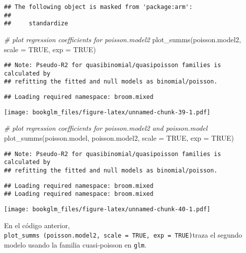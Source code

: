\documentclass[
]{book}
\newenvironment{Shaded}{\begin{snugshade}}{\end{snugshade}}
\newcommand{\AttributeTok}[1]{\textcolor[rgb]{0.77,0.63,0.00}{#1}}
\newcommand{\CommentTok}[1]{\textcolor[rgb]{0.56,0.35,0.01}{\textit{#1}}}
\newcommand{\ConstantTok}[1]{\textcolor[rgb]{0.00,0.00,0.00}{#1}}
\newcommand{\FunctionTok}[1]{\textcolor[rgb]{0.00,0.00,0.00}{#1}}
\newcommand{\NormalTok}[1]{#1}
\begin{document}
\begin{verbatim}
## The following object is masked from 'package:arm':
## 
##     standardize
\end{verbatim}

\begin{Shaded}
\begin{Highlighting}[]
\CommentTok{\# plot regression coefficients for poisson.model2}
\FunctionTok{plot\_summs}\NormalTok{(poisson.model2, }\AttributeTok{scale =} \ConstantTok{TRUE}\NormalTok{, }\AttributeTok{exp =} \ConstantTok{TRUE}\NormalTok{)}
\end{Highlighting}
\end{Shaded}

\begin{verbatim}
## Note: Pseudo-R2 for quasibinomial/quasipoisson families is calculated by
## refitting the fitted and null models as binomial/poisson.
\end{verbatim}

\begin{verbatim}
## Loading required namespace: broom.mixed
\end{verbatim}

\texttt{[image: bookglm\_files/figure-latex/unnamed-chunk-39-1.pdf]}

\begin{Shaded}
\begin{Highlighting}[]
\CommentTok{\# plot regression coefficients for poisson.model2 and poisson.model}
\FunctionTok{plot\_summs}\NormalTok{(poisson.model, poisson.model2, }\AttributeTok{scale =} \ConstantTok{TRUE}\NormalTok{, }\AttributeTok{exp =} \ConstantTok{TRUE}\NormalTok{)}
\end{Highlighting}
\end{Shaded}

\begin{verbatim}
## Note: Pseudo-R2 for quasibinomial/quasipoisson families is calculated by
## refitting the fitted and null models as binomial/poisson.
\end{verbatim}

\begin{verbatim}
## Loading required namespace: broom.mixed
## Loading required namespace: broom.mixed
\end{verbatim}

\texttt{[image: bookglm\_files/figure-latex/unnamed-chunk-40-1.pdf]}

En el código anterior, \texttt{plot\_summs\ (poisson.model2,\ scale\ =\ TRUE,\ exp\ =\ TRUE)}traza el segundo modelo usando la familia cuasi-poisson en \texttt{glm}.
\end{document}
